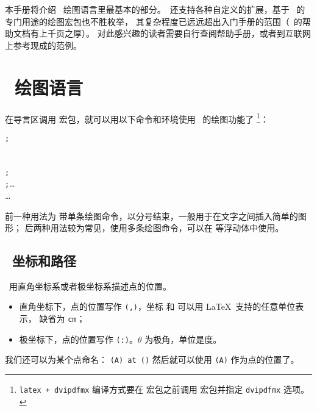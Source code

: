 本手册将介绍 \TikZ\ 绘图语言里最基本的部分。\TikZ\ 还支持各种自定义的扩展，基于 \TikZ\ 的专门用途的绘图宏包也不胜枚举，
其复杂程度已远远超出入门手册的范围（\TikZ\ 的帮助文档有上千页之厚）。
对此感兴趣的读者需要自行查阅帮助手册，或者到互联网上参考现成的范例。

\section{\TikZ\ 绘图语言}\label{sec:tikz}

在导言区调用  宏包，就可以用以下命令和环境使用 \TikZ\ 的绘图功能了%
\footnote{\texttt{latex + dvipdfmx} 编译方式要在  宏包之前调用  宏包并指定 \texttt{dvipdfmx} 选项。}：
\begin{command}
\oarg*{\ldots} \texttt{;} \\[1ex]
\oarg*{\ldots}  \\[1ex]
\oarg*{\ldots} \\
\texttt{;} \\
\texttt{;}\ldots \\
\ldots \\
\end{command}

前一种用法为  带单条绘图命令，以分号结束，一般用于在文字之间插入简单的图形；
后两种用法较为常见，使用多条绘图命令，可以在  等浮动体中使用。

\subsection{\TikZ\ 坐标和路径}\label{subsec:tikz-path}

\TikZ\ 用直角坐标系或者极坐标系描述点的位置。
\begin{itemize}
  \item 直角坐标下，点的位置写作 \texttt{(,)}，坐标  和  可以用 \LaTeX\ 支持的任意单位表示，
  缺省为 \texttt{cm}；
  \item 极坐标下，点的位置写作 \texttt{(\Arg{$\theta$}:)}。$\theta$ 为极角，单位是度。
\end{itemize}

我们还可以为某个点命名： \texttt{(A) at ()} 
然后就可以使用 \texttt{(A)} 作为点的位置了。

